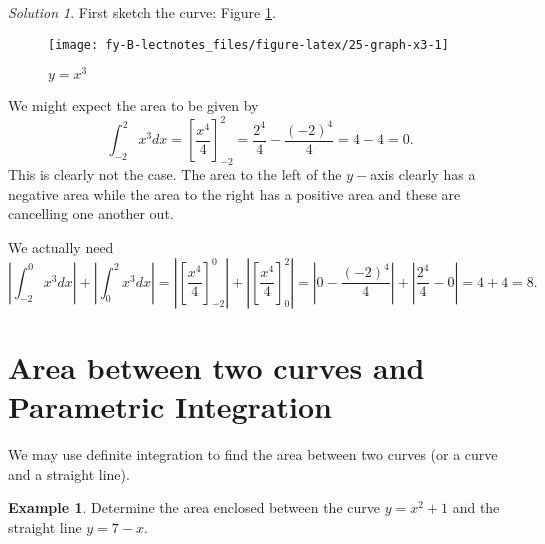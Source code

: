 \documentclass[
  11pt,
  oneside]{book}
\newcommand{\slide}{}
\theoremstyle{definition}
\theoremstyle{definition}
\newtheorem{example}{Example}[chapter]
\theoremstyle{definition}
\theoremstyle{definition}
\theoremstyle{remark}
\newtheorem*{solution}{Solution}
\begin{document}
\begin{solution}
First sketch the curve: Figure \ref{fig:25-graph-x3}.

\begin{figure}

{\centering \texttt{[image: fy-B-lectnotes\_files/figure-latex/25-graph-x3-1]} 

}

\caption{$y=x^3$}\label{fig:25-graph-x3}
\end{figure}

We might expect the area to be given by
\[
\int_{-2}^2x^3dx = \left[\frac{x^4}4\right]_{-2}^2 = \frac{2^4}4-\frac{(-2)^4}4 = 4-4 = 0.
\]
This is clearly not the case. The area to the left of the \(y-\)axis clearly has a negative area while the area to the right has a positive area and these are cancelling one another out.

We actually need
\[
\left|\int_{-2}^0x^3dx\right|+\left|\int_0^2x^3dx\right| = \left|\left[\frac{x^4}4\right]_{-2}^0\right|+\left|\left[\frac{x^4}4\right]_{0}^2\right| = \left|0-\frac{(-2)^4}4\right|+\left|\frac{2^4}4-0\right| = 4+4=8.
\]
\end{solution}

\slide

\section{Area between two curves and Parametric Integration}\label{area-between-two-curves-and-parametric-integration}

We may use definite integration to find the area between two curves (or a curve and a straight line).

\begin{example}
Determine the area enclosed between the curve \(y=x^2+1\) and the straight line \(y=7-x\).
\end{example}
\end{document}
